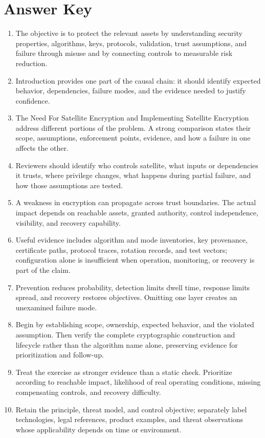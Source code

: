 \documentclass[11pt]{article}
\begin{document}
\section*{Answer Key}
\begin{enumerate}
\item The objective is to protect the relevant assets by understanding security properties, algorithms, keys, protocols, validation, trust assumptions, and failure through misuse and by connecting controls to measurable risk reduction.
\item Introduction provides one part of the causal chain: it should identify expected behavior, dependencies, failure modes, and the evidence needed to justify confidence.
\item The Need For Satellite Encryption and Implementing Satellite Encryption address different portions of the problem. A strong comparison states their scope, assumptions, enforcement points, evidence, and how a failure in one affects the other.
\item Reviewers should identify who controls satellite, what inputs or dependencies it trusts, where privilege changes, what happens during partial failure, and how those assumptions are tested.
\item A weakness in encryption can propagate across trust boundaries. The actual impact depends on reachable assets, granted authority, control independence, visibility, and recovery capability.
\item Useful evidence includes algorithm and mode inventories, key provenance, certificate paths, protocol traces, rotation records, and test vectors; configuration alone is insufficient when operation, monitoring, or recovery is part of the claim.
\item Prevention reduces probability, detection limits dwell time, response limits spread, and recovery restores objectives. Omitting one layer creates an unexamined failure mode.
\item Begin by establishing scope, ownership, expected behavior, and the violated assumption. Then verify the complete cryptographic construction and lifecycle rather than the algorithm name alone, preserving evidence for prioritization and follow-up.
\item Treat the exercise as stronger evidence than a static check. Prioritize according to reachable impact, likelihood of real operating conditions, missing compensating controls, and recovery difficulty.
\item Retain the principle, threat model, and control objective; separately label technologies, legal references, product examples, and threat observations whose applicability depends on time or environment.
\end{enumerate}
\end{document}

